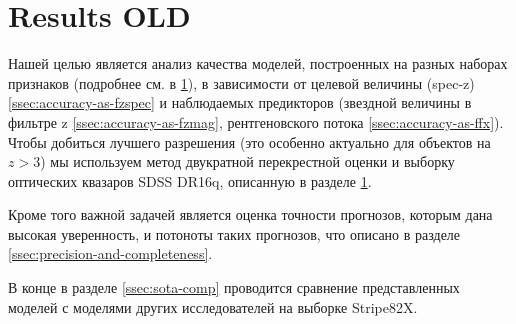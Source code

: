 \documentclass[fleqn,usenatbib]{mnras}
\begin{document}
\clearpage\clearpage\clearpage\clearpage
\clearpage
\section{Results OLD}



Нашей целью является анализ качества моделей, построенных на разных наборах признаков (подробнее см. в \ref{}), в зависимости от целевой величины (spec-z) \ref{ssec:accuracy-as-fzspec} и наблюдаемых предикторов (звездной величины в фильтре z \ref{ssec:accuracy-as-fzmag}, рентгеновского потока \ref{ssec:accuracy-as-ffx}). Чтобы добиться лучшего разрешения (это особенно актуально для объектов на $z > 3$) мы используем метод двукратной перекрестной оценки и выборку оптических квазаров SDSS DR16q, описанную в разделе \ref{}.

Кроме того важной задачей является оценка точности прогнозов, которым дана высокая уверенность, и потоноты таких прогнозов, что описано в разделе \ref{ssec:precision-and-completeness}.

В конце в разделе \ref{ssec:sota-comp} проводится сравнение представленных моделей с моделями других исследователей на выборке Stripe82X.


\end{document}
